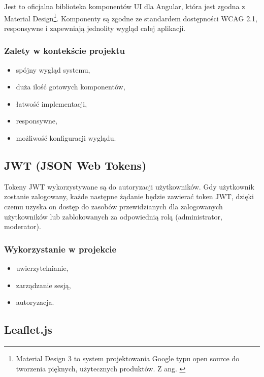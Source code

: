 Jest to oficjalna biblioteka komponentów UI dla Angular, która jest zgodna z Material Design\footnote{Material Design 3 to system projektowania Google typu open source do tworzenia pięknych, użytecznych produktów. Z ang. \cite{material_design}}.
Komponenty są zgodne ze standardem dostępności WCAG 2.1, responsywne i zapewniają jednolity wygląd całej aplikacji.

\subsubsection{Zalety w kontekście projektu}
\begin{itemize}
	\item spójny wygląd systemu,
	\item duża ilość gotowych komponentów,
	\item łatwość implementacji,
	\item responsywne,
	\item możliwość konfiguracji wyglądu.
\end{itemize}

\subsection{JWT (JSON Web Tokens)}

Tokeny JWT wykorzystywane są do autoryzacji użytkowników. Gdy użytkownik zostanie zalogowany, każde następne żądanie będzie zawierać token JWT, dzięki czemu uzyska on dostęp do zasobów przewidzianych dla zalogowanych użytkowników lub zablokowanych za odpowiednią rolą (administrator, moderator).

\subsubsection{Wykorzystanie w projekcie}

\begin{itemize}
	\item uwierzytelnianie,
	\item zarządzanie sesją,
	\item autoryzacja.
\end{itemize}

\subsection{Leaflet.js}
